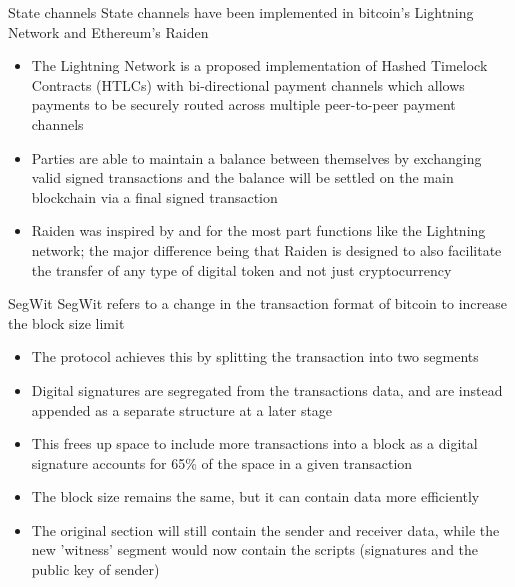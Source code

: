 \documentclass[10pt]{beamer}
\begin{document}
\begin{frame}{State channels}
	State channels have been implemented in bitcoin's Lightning Network and Ethereum's Raiden
	\begin{itemize}
		\item The Lightning Network is a proposed implementation of Hashed Timelock Contracts (HTLCs) with bi-directional payment channels which allows payments to be securely routed across multiple peer-to-peer payment channels
		\item Parties are able to maintain a balance between themselves by exchanging valid signed transactions and the balance will be settled on the main blockchain via a final signed
		transaction
		\item Raiden was inspired by and for the most part functions like the Lightning network; the major difference being that Raiden is designed to also facilitate the transfer of any type of digital token and not just cryptocurrency
	\end{itemize}
\end{frame}


\begin{frame}{SegWit}
	SegWit refers to a change in the transaction format of bitcoin to increase the block size limit
	\begin{itemize}
		\item The protocol achieves this by splitting the transaction into two segments
		\item Digital signatures are segregated from the transactions data, and are instead appended as a separate structure at a later stage
		\item This frees up space to include more transactions into a block as a digital signature accounts for 65\% of the space in a given transaction
		\item The block size remains the same, but it can contain data more efficiently
		\item The original section will still contain the sender and receiver data, while the new 'witness' segment would now contain the scripts (signatures and the public key of sender)
	\end{itemize}
\end{frame}

\end{document}
